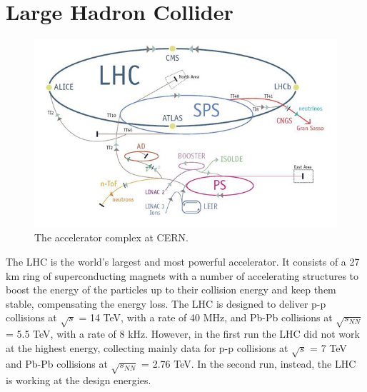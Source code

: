 \section{Large Hadron Collider}
%
\begin{figure}
  \centering
  \includegraphics[scale=0.55]{figures/LHC.jpg}
  \caption{The accelerator complex at CERN.}
  \label{fig:LHC}
\end{figure}
%
The LHC is the world's largest and most powerful accelerator. It consists of a 27 km ring of superconducting magnets with a number of accelerating structures to boost the energy of the particles up to their collision energy and keep them stable, compensating the energy loss. The LHC is designed to deliver p-p collisions at $\sqrt{s}$ = 14 TeV, with a rate of 40 MHz, and Pb-Pb collisions at $\sqrt{s_{NN}}$ = 5.5 TeV, with a rate of 8 kHz. However, in the first run the LHC did not work at the highest energy, collecting mainly data for p-p collisions at $\sqrt{s}$ = 7 TeV and Pb-Pb collisions at $\sqrt{s_{NN}}$ = 2.76 TeV. In the second run, instead, the LHC is working at the design energies.\\
